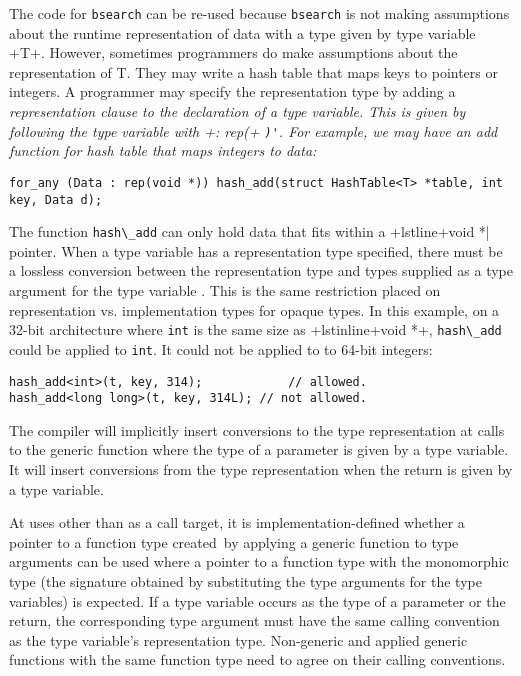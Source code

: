 The code for \lstinline+bsearch+ can be re-used because \lstinline+bsearch+ is
not making assumptions about the runtime representation of data with a type
given by type variable \var+T+.  However, sometimes programmers do make assumptions 
about the representation of T.  They may write a hash table that maps
keys to pointers or integers.    A programmer may specify the representation type by
adding a \it{representation} clause to the declaration of a type variable.  This
is given by following the type variable with \lstlinine+: rep(+ \lstinline+)'+.
For example, we may have an add function for hash table that maps integers to data:
\begin{lstlisting}
for_any (Data : rep(void *)) hash_add(struct HashTable<T> *table, int key, Data d);
\end{lstlisting}
The function \lstinline+hash\_add+ can only hold data that fits within a 
+lstline+void *| pointer.  When a type variable has a representation type specified, 
there must be  a lossless conversion between the representation type and types supplied as
a type argument for the type variable .  This is the same restriction placed on 
representation vs. implementation types for opaque types.   In this example, on a
32-bit architecture where \lstinline+int+ is the same size as +lstinline+void *+, 
\lstinline+hash\_add+ could be applied to \lstinline+int+.  It could not be applied to
to 64-bit integers:
\begin{lstlisting}
hash_add<int>(t, key, 314);            // allowed.
hash_add<long long>(t, key, 314L); // not allowed.
\end{lstlisting}
The compiler will implicitly insert conversions to the type representation
at calls to the generic function where the type of a parameter is given
by a type variable.  It will insert conversions from the type representation
when the return is given by a type variable.

At uses other than as a call target, it is implementation-defined whether a pointer to a function type 
created\ by applying a generic function to type arguments can be used where
a pointer to a function type with the monomorphic type (the signature obtained
by substituting the type arguments for the type variables) is expected.  If a type
variable occurs as the type of a parameter or the return, the corresponding type argument
must have the same calling convention as the type variable's representation
type.   Non-generic and applied generic functions with the same function type
need to agree on their calling conventions.


